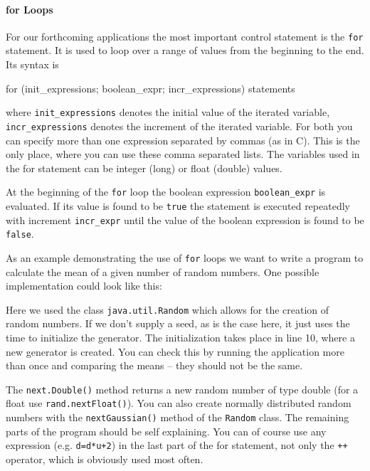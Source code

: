 \paragraph{for Loops}
For our forthcoming applications the most important control statement
is the \verb|for| statement. It is used to loop over a range of values
from the beginning to the end. Its syntax is
\begin{sverbatim}
for (init_expressions; boolean_expr; incr_expressions) {
    statements
}
\end{sverbatim}
where \verb|init_expressions| denotes the initial value of the iterated
variable, \verb|incr_expressions| denotes the increment of the iterated
variable. For both you can specify more than one expression separated
by commas (as in C). This is the only place, where you can use these comma
separated lists. The variables used in the for statement can be 
integer (long) or float (double) values. 

At the beginning of the \verb|for| loop the boolean expression
\verb|boolean_expr| is evaluated. If its value is found to be 
\verb|true| the statement is executed repeatedly with increment
\verb|incr_expr| until the value of the boolean expression is found to
be \verb|false|.

As an example demonstrating the use of
\verb|for| loops we want to write a program to calculate the mean of
a given number of random numbers. One possible implementation
could look like this:


Here we used the class \verb|java.util.Random| which allows for
the creation of random numbers. If we don't supply a seed, as is the
case here, it just uses the time to initialize the generator. The
initialization takes place in line 10, where a new generator is created.
You can check this by running the application more than once and comparing
the means -- they should not be the same. 

The \verb|next.Double()| method returns a new random number of type
double (for a float use \verb|rand.nextFloat()|). You can also create normally 
distributed random numbers with the \verb|nextGaussian()| method of
the \verb|Random| class.
The remaining parts of the program should be self explaining. You can of
course use any expression (e.g. \verb|d=d*u+2|) 
in the last part of the for statement, not only
the \verb|++| operator, which is obviously used most often. 

